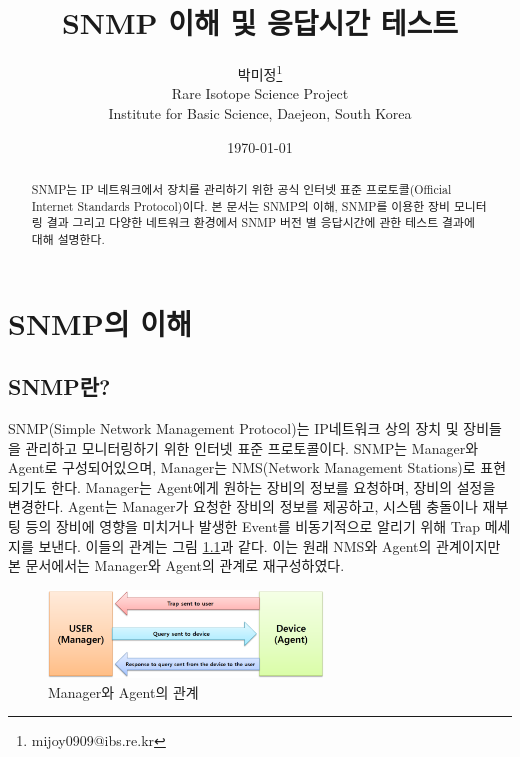 \documentclass[11pt
  , a4paper
  , article
  , oneside
]{memoir}
\begin{document}
\newcommand{\technumber}{
  RAON Control-Document Series\\
  Revision : v1.0,   Release : Jan. 02. 2015}
\title{\textbf{SNMP 이해 및 응답시간 테스트}}

\author{박미정\thanks{mijoy0909@ibs.re.kr} \\

  Rare Isotope Science Project\\
  Institute for Basic Science, Daejeon, South Korea
}
\date{\today}

\renewcommand{\maketitlehooka}{\begin{flushright}\textsf{\technumber}\end{flushright}}

\maketitle

\begin{abstract}
SNMP는 IP 네트워크에서 장치를 관리하기 위한 공식 인터넷 표준 프로토콜(Official Internet Standards Protocol)\citep{oisp}이다. 본 문서는 SNMP의 이해, SNMP를 이용한 장비 모니터링 결과 그리고 다양한 네트워크 환경에서 SNMP 버전 별 응답시간에 관한 테스트 결과에 대해 설명한다. 
\end{abstract}

\chapter{SNMP의 이해}
\section{SNMP란?}
SNMP(Simple Network Management Protocol)는 IP네트워크 상의 장치 및 장비들을 관리하고 모니터링하기 위한 인터넷 표준 프로토콜이다. SNMP는 Manager와 Agent로 구성되어있으며, Manager는 NMS(Network Management Stations)로 표현되기도 한다. Manager는 Agent에게 원하는 장비의 정보를 요청하며, 장비의 설정을 변경한다. Agent는 Manager가 요청한 장비의 정보를 제공하고, 시스템 충돌이나 재부팅 등의 장비에 영향을 미치거나 발생한 Event를 비동기적으로 알리기 위해 Trap 메세지를 보낸다. 이들의 관계는 그림 \ref{fig:relationship_m_a}\citep{essential_snmp}과 같다. 이는 원래 NMS와 Agent의 관계이지만 본 문서에서는 Manager와 Agent의 관계로 재구성하였다.
\begin{figure}[h!]
  \centering
  \includegraphics[width=0.65\textwidth]{./images/relationship_m_a.eps}
  \caption{Manager와 Agent의 관계}
  \label{fig:relationship_m_a}   
\end{figure}
\end{document}
